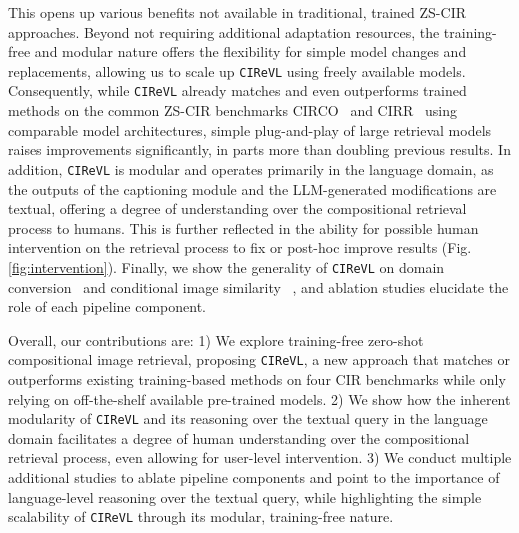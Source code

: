 \documentclass{article} \usepackage{iclr2024_conference,times}
\newcommand{\methodName}{\texttt{CIReVL}\xspace} \newcommand{\methodNameNS}{\texttt{CIReVL}}
\begin{document}
This opens up various benefits not available in traditional, trained ZS-CIR approaches. Beyond not requiring additional adaptation resources, the training-free and modular nature offers the flexibility for simple model changes and replacements, allowing us to scale up \methodName using freely available models. Consequently, while \methodName already matches and even outperforms trained methods on the common ZS-CIR benchmarks CIRCO~\citep{searle} and CIRR~\citep{cirr} using comparable model architectures, simple plug-and-play of large retrieval models raises improvements significantly, in parts more than doubling previous results.
In addition, \methodName is modular and operates primarily in the language domain, as the outputs of the captioning module and the LLM-generated modifications are textual, offering a degree of understanding over the compositional retrieval process to humans. 
This is further reflected in the ability for possible human intervention on the retrieval process to fix or post-hoc improve results (Fig.\ref{fig:intervention}). 
Finally, we show the generality of \methodName on domain conversion~\citep{pic2word} and conditional image similarity ~\citep{vaze2023genecis}, and ablation studies elucidate the role of each pipeline component.

Overall, our contributions are:
1) We explore training-free zero-shot compositional image retrieval, proposing \methodNameNS, a new approach that matches or outperforms existing training-based methods on four CIR benchmarks while only relying on off-the-shelf available pre-trained models. 2) We show how the inherent modularity of \methodName and its reasoning over the textual query in the language domain facilitates a degree of human understanding over the compositional retrieval process, even allowing for user-level intervention. 3) We conduct multiple additional studies to ablate pipeline components and point to the importance of language-level reasoning over the textual query, while highlighting the simple scalability of \methodName through its modular, training-free nature.
\end{document}
